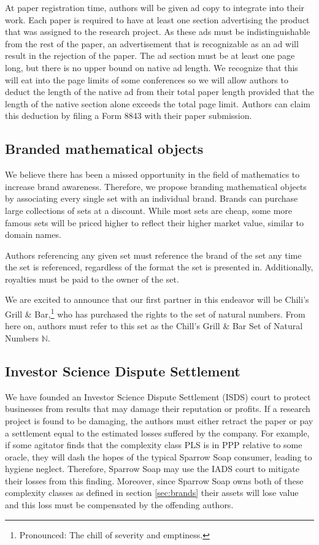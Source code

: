 At paper registration time, authors will be given ad copy to integrate into
their work.
Each paper is required to have at least one section advertising the product
that was assigned to the research project.
As these ads must be indistinguishable from the rest of the paper, an
advertisement that is recognizable as an ad will result in the rejection of the
paper.
The ad section must be at least one page long, but there is no upper bound on
native ad length.
We recognize that this will eat into the page limits of some conferences so we
will allow authors to deduct the length of the native ad from their total paper
length provided that the length of the native section alone exceeds the total
page limit.
Authors can claim this deduction by filing a Form 8843 with their paper
submission.

\subsection{Branded mathematical objects}
\label{sec:brands}
We believe there has been a missed opportunity in the field of mathematics to
increase brand awareness.
Therefore, we propose branding mathematical objects by associating every single
set with an individual brand.
Brands can purchase large collections of sets at a discount.
While most sets are cheap, some more famous sets will be priced higher to
reflect their higher market value, similar to domain names.

Authors referencing any given set must reference the brand of the set any time
the set is referenced, regardless of the format the set is presented  in.
Additionally, royalties must be paid to the owner of the set.

We are excited to announce that our first partner in this endeavor will be
Chili's Grill \& Bar,\footnote{Pronounced:  The chill of severity and emptiness.} who has purchased the rights to the set of natural
numbers.
From here on, authors must refer to this set as the Chill's Grill \& Bar Set of
Natural Numbers \(\mathbb{N}\).

\subsection{Investor Science Dispute Settlement}
We have founded an Investor Science Dispute Settlement (ISDS) court to protect
businesses from results that may damage their reputation or profits.
If a research project is found to be damaging, the authors must either retract
the paper or pay a settlement equal to the estimated losses suffered by the
company.
For example, if some agitator finds that the complexity class PLS is in PPP
relative to some oracle, they will dash the hopes of the typical Sparrow Soap
consumer, leading to hygiene neglect.
Therefore, Sparrow Soap may use the IADS court to mitigate their losses from
this finding.
Moreover, since Sparrow Soap owns both of these complexity classes as defined
in section \autoref{sec:brands} their assets will lose value and
this loss must be compensated by the offending authors.

